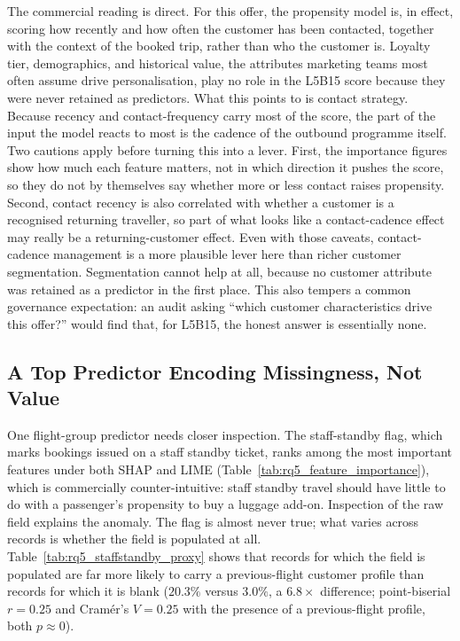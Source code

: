 \documentclass[oneside]{memoir} %
\begin{document}


The commercial reading is direct. For this offer, the propensity model is, in effect, scoring how recently and how often the customer has been contacted, together with the context of the booked trip, rather than who the customer is. Loyalty tier, demographics, and historical value, the attributes marketing teams most often assume drive personalisation, play no role in the L5B15 score because they were never retained as predictors. What this points to is contact strategy. Because recency and contact-frequency carry most of the score, the part of the input the model reacts to most is the cadence of the outbound programme itself. Two cautions apply before turning this into a lever. First, the importance figures show how much each feature matters, not in which direction it pushes the score, so they do not by themselves say whether more or less contact raises propensity. Second, contact recency is also correlated with whether a customer is a recognised returning traveller, so part of what looks like a contact-cadence effect may really be a returning-customer effect. Even with those caveats, contact-cadence management is a more plausible lever here than richer customer segmentation. Segmentation cannot help at all, because no customer attribute was retained as a predictor in the first place. This also tempers a common governance expectation: an audit asking ``which customer characteristics drive this offer?'' would find that, for L5B15, the honest answer is essentially none.

\subsection{A Top Predictor Encoding Missingness, Not Value}

One flight-group predictor needs closer inspection. The staff-standby flag, which marks bookings issued on a staff standby ticket, ranks among the most important features under both SHAP and LIME (Table~\ref{tab:rq5_feature_importance}), which is commercially counter-intuitive: staff standby travel should have little to do with a passenger's propensity to buy a luggage add-on. Inspection of the raw field explains the anomaly. The flag is almost never true; what varies across records is whether the field is populated at all. Table~\ref{tab:rq5_staffstandby_proxy} shows that records for which the field is populated are far more likely to carry a previous-flight customer profile than records for which it is blank ($20.3\%$ versus $3.0\%$, a $6.8\times$ difference; point-biserial $r = 0.25$ and Cram\'er's $V = 0.25$ with the presence of a previous-flight profile, both $p \approx 0$).
\end{document}
